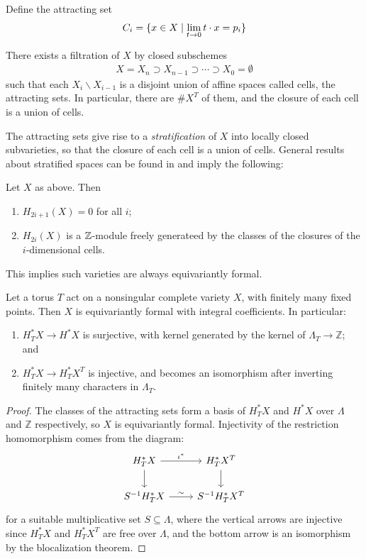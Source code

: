 Define the attracting set \begin{align*}
	C_i = \{x\in X \mid \lim_{t\to 0} t\cdot x = p_i\}
\end{align*}

\begin{theorem}
	There exists a filtration of $X$ by closed subschemes \begin{align*}
		X = X_n \supset X_{n-1} \supset \cdots \supset X_0 = \emptyset
	\end{align*} such that
	each $X_i \backslash X_{i-1}$ is a disjoint union of affine spaces called cells, the attracting sets. In particular, there are $\#X^T$ of them, and the closure of each cell is a union of cells.
\end{theorem}
The attracting sets give rise to a \emph{stratification} of $X$ into locally closed
subvarieties, so that the closure of each cell is a union of cells. General results
about stratified spaces can be found in \cite{eisenbud-harris} and imply the following:

\begin{cor}
	Let $X$ as above. Then \begin{enumerate}
		\item $H_{2i+1}(X) = 0$ for all $i$;
		\item $H_{2i}(X)$ is a $\mathbb{Z}$-module freely generateed by the classes
		      of the closures of the $i$-dimensional cells.
	\end{enumerate}
\end{cor} This implies such varieties are always equivariantly formal.
\begin{cor}
	Let a torus \( T \) act on a nonsingular complete variety \( X \), with finitely many fixed points. Then \( X \) is equivariantly formal with integral coefficients. In particular:
	\begin{enumerate}
		\item \( H_T^* X \to H^* X \) is surjective, with kernel generated by the kernel of \( \Lambda_T \to \mathbb{Z} \); and
		\item \( H_T^* X \to H_T^* X^T \) is injective, and becomes an isomorphism after inverting finitely many characters in \( \Lambda_T \).
	\end{enumerate}
\end{cor}

\begin{proof}
	The classes of the attracting sets form a basis of \( H_T^* X \) and \( H^* X \) over \( \Lambda \) and \( \mathbb{Z} \) respectively, so \( X \) is equivariantly formal. Injectivity of the restriction homomorphism comes from the diagram:
	\[
		\begin{tikzcd}
			H_T^* X \arrow[r, "\iota^*"] \arrow[d] & H_T^* X^T \arrow[d] \\
			S^{-1} H_T^* X \arrow[r, "\sim"]       & S^{-1} H_T^* X^T
		\end{tikzcd}
	\]
	for a suitable multiplicative set \( S \subseteq \Lambda \), where the vertical arrows are injective since \( H_T^* X \) and \( H_T^* X^T \) are free over \( \Lambda \), and the bottom arrow is an isomorphism by the blocalization theorem.
\end{proof}

